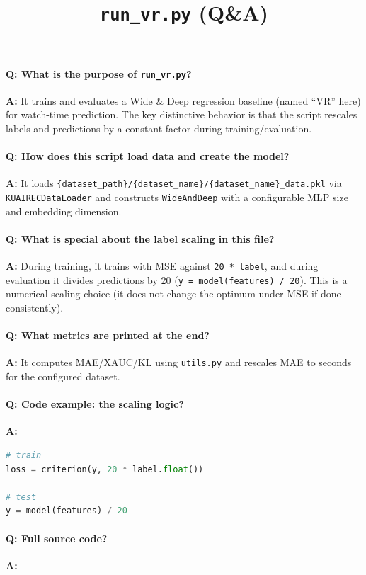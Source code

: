 \documentclass[11pt]{article}
\title{\texttt{run\_vr.py} (Q\&A)}
\author{}
\date{}
\begin{document}
\maketitle

\paragraph{Q: What is the purpose of \texttt{run\_vr.py}?}
\textbf{A:} It trains and evaluates a Wide \& Deep regression baseline (named ``VR'' here) for watch-time prediction. The key distinctive behavior is that the script rescales labels and predictions by a constant factor during training/evaluation.

\paragraph{Q: How does this script load data and create the model?}
\textbf{A:} It loads \lstinline|{dataset_path}/{dataset_name}/{dataset_name}_data.pkl| via \lstinline|KUAIRECDataLoader| and constructs \lstinline|WideAndDeep| with a configurable MLP size and embedding dimension.

\paragraph{Q: What is special about the label scaling in this file?}
\textbf{A:} During training, it trains with MSE against \lstinline|20 * label|, and during evaluation it divides predictions by 20 (\lstinline|y = model(features) / 20|). This is a numerical scaling choice (it does not change the optimum under MSE if done consistently).

\paragraph{Q: What metrics are printed at the end?}
\textbf{A:} It computes MAE/XAUC/KL using \lstinline|utils.py| and rescales MAE to seconds for the configured dataset.

\paragraph{Q: Code example: the scaling logic?}
\textbf{A:}
\begin{lstlisting}[language=Python]
# train
loss = criterion(y, 20 * label.float())

# test
y = model(features) / 20
\end{lstlisting}

\paragraph{Q: Full source code?}
\textbf{A:}

\end{document}
